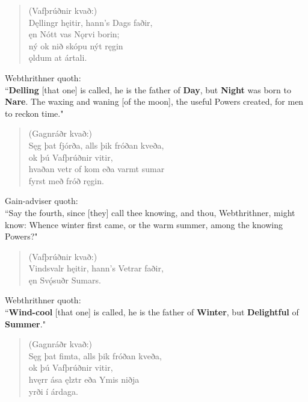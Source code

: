 \begin{verse}
(Vafþrúðnir kvað:) \\%
\bva Dęllingr hęitir, \hld hann's Dags faðir, \\%
\ind ęn Nótt vas Nǫrvi borin; \\%
ný ok nið \hld skópu nýt ręgin \\%
\ind ǫldum at ártali.\\%
\end{verse}

\bvb Webthrithner quoth: \\ “\textbf{Delling} [that one] is called, he is the father of \textbf{Day}, but \textbf{Night} was born to \textbf{Nare}. The waxing and waning [of the moon], the useful Powers created, for men to reckon time." \\

\begin{verse}
(Gagnráðr kvað:) \\%
\bva Sęg þat fjórða, \hld alls þik fróðan kveða, \\%
\ind ok þú Vafþrúðnir vitir, \\%
hvaðan vetr of kom \hld eða varmt sumar \\%
\ind fyrst með fróð ręgin.\\%
\end{verse}

\bvb Gain-adviser quoth: \\ “Say the fourth, since [they] call thee knowing, and thou, Webthrithner, might know: Whence winter first came, or the warm summer, among the knowing Powers?" \\

\begin{verse}
(Vafþrúðnir kvað:) \\%
\bva Vindsvalr hęitir, \hld hann's Vetrar faðir, \\%
\ind ęn Svǫ́suðr Sumars.\footnotemark[15]\\%
\end{verse}

\bvb Webthrithner quoth: \\ “\textbf{Wind-cool} [that one] is called, he is the father of \textbf{Winter}, but \textbf{Delightful} of \textbf{Summer}." \\

\begin{verse}
(Gagnráðr kvað:) \\%
\bva Sęg þat fimta, \hld alls þik fróðan kveða, \\%
\ind ok þú Vafþrúðnir vitir, \\%
hvęrr ása ęlztr \hld eða Ymis niðja \\%
\ind yrði í árdaga.\\%
\end{verse}

